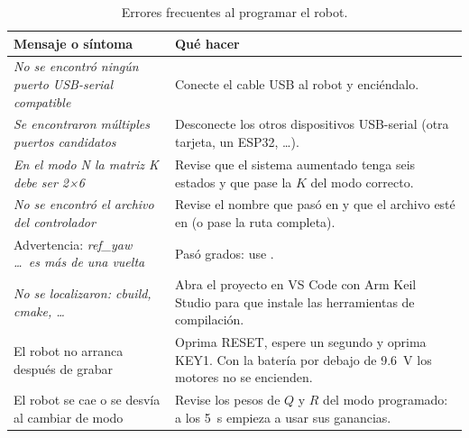 \documentclass[11pt,letterpaper]{article}
\newcommand{\cod}[1]{\texttt{\detokenize{#1}}}
\begin{document}
\begin{table}[H]
\centering\small
\begin{tabularx}{\textwidth}{@{}>{\raggedright\arraybackslash}p{6.3cm}X@{}}
\toprule
Mensaje o síntoma & Qué hacer\\
\midrule
\emph{No se encontró ningún puerto USB-serial compatible} & Conecte el cable USB al robot
  y enciéndalo.\\
\emph{Se encontraron múltiples puertos candidatos} & Desconecte los otros dispositivos
  USB-serial (otra tarjeta, un ESP32, \dots).\\
\emph{En el modo N la matriz K debe ser 2×6} & Revise que el sistema aumentado tenga seis
  estados y que pase la $K$ del modo correcto.\\
\emph{No se encontró el archivo del controlador} & Revise el nombre que pasó en \cod{file}
  y que el archivo esté en \cod{APP/} (o pase la ruta completa).\\
Advertencia: \emph{ref\_yaw \dots\ es más de una vuelta} & Pasó grados: use
  \cod{deg2rad(...)}.\\
\emph{No se localizaron: cbuild, cmake, \dots} & Abra el proyecto en VS Code con Arm Keil
  Studio para que instale las herramientas de compilación.\\
El robot no arranca después de grabar & Oprima RESET, espere un segundo y oprima KEY1. Con
  la batería por debajo de \SI{9.6}{V} los motores no se encienden.\\
El robot se cae o se desvía al cambiar de modo & Revise los pesos de $Q$ y $R$ del modo
  programado: a los \SI{5}{s} empieza a usar sus ganancias.\\
\bottomrule
\end{tabularx}
\caption{Errores frecuentes al programar el robot.}
\end{table}
\end{document}
